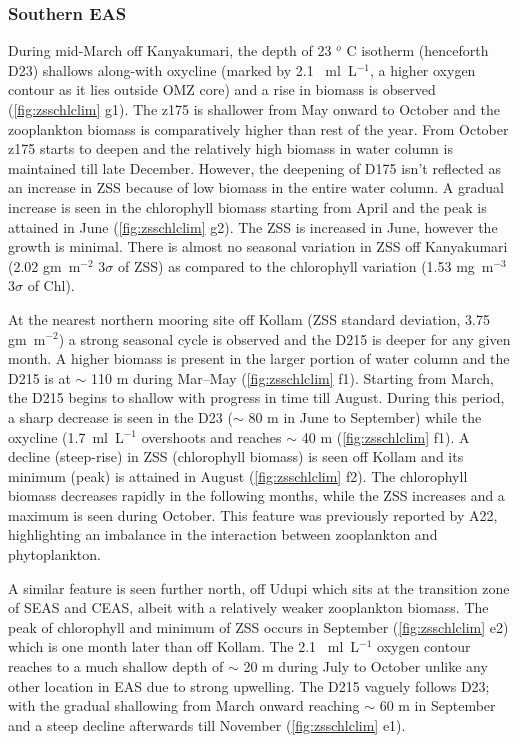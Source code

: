 \documentclass{article}
\begin{document}
		\subsubsection{Southern EAS}
		During mid-March off Kanyakumari, the depth of 23 $^o$ C isotherm (henceforth D23) shallows along-with oxycline (marked by 2.1 ~ml~L$^{-1}$, a higher oxygen contour as it lies outside OMZ core) and a rise in biomass is observed (\cref{fig:zsschlclim} g1). The z175 is shallower from May onward to October and the zooplankton biomass is comparatively higher than rest of the year. From October z175 starts to deepen and the relatively high biomass in water column is maintained till late December. However, the deepening of D175 isn't reflected as an increase in ZSS because of low biomass in the entire water column. A gradual increase is seen in the chlorophyll biomass starting from April and the peak is attained in June (\cref{fig:zsschlclim} g2). The ZSS is increased in June, however the growth is minimal. There is almost no seasonal variation in ZSS off Kanyakumari (2.02 gm~m$^{-2}$ 3$\sigma$ of ZSS) as compared to the chlorophyll variation (1.53 mg~m$^{-3}$ 3$\sigma$ of Chl).
		
		At the nearest northern mooring site off Kollam (ZSS standard deviation, 3.75 gm~m$^{-2}$) a strong seasonal cycle is observed and the D215 is deeper for any given month. A higher biomass is present in the larger portion of water column and the D215 is at $\sim$ 110 m during Mar--May (\cref{fig:zsschlclim} f1). Starting from March, the D215 begins to shallow with progress in time till August. During this period, a sharp decrease is seen in the D23 ($\sim$ 80 m in June to September) while the oxycline (1.7~ml~L$^{-1}$ overshoots and reaches $\sim$ 40 m (\cref{fig:zsschlclim} f1). A decline (steep-rise) in ZSS (chlorophyll  biomass) is seen off Kollam and its minimum (peak) is attained in August (\cref{fig:zsschlclim} f2). The chlorophyll biomass decreases rapidly in the following months, while the ZSS increases and a maximum is seen during October. This feature was previously reported by A22, highlighting an imbalance in the interaction between zooplankton and phytoplankton.
	
		A similar feature is seen further north, off Udupi which sits at the transition zone of SEAS and CEAS, albeit with a relatively weaker zooplankton biomass. The peak of chlorophyll and minimum of ZSS occurs in September (\cref{fig:zsschlclim} e2) which is one month later than off Kollam. The 2.1 ~ml~L$^{-1}$  oxygen contour reaches to a much shallow depth of $\sim$ 20 m during July to October unlike any other location in EAS due to strong upwelling. The D215 vaguely follows D23; with the gradual shallowing from March onward reaching $\sim$ 60 m in September and a steep decline afterwards till November (\cref{fig:zsschlclim} e1).
\end{document}
